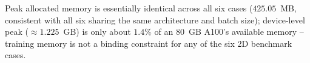 \documentclass[11pt]{article}
\begin{document}
Peak allocated memory is essentially identical across all six cases
($425.05$~MB, consistent with all six sharing the same architecture and
batch size); device-level peak ($\approx1.225$~GB) is only about
$1.4\%$ of an 80~GB A100's available memory -- training memory is not a
binding constraint for any of the six 2D benchmark cases.
\end{document}
